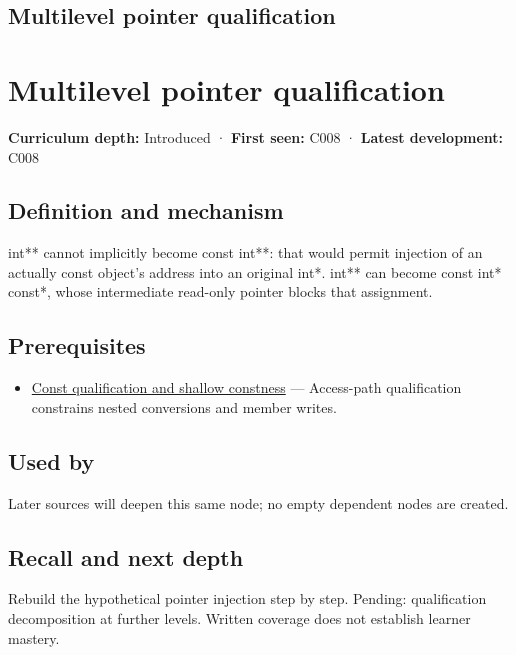 \hypertarget{appendix-5e1a7561cd98}{}
\section*{Multilevel pointer qualification}
\chapter{Multilevel pointer qualification}\label{appendix-5e1a7561cd98-multilevel-pointer-qualification}

\textbf{Curriculum depth:} Introduced · \textbf{First seen:} C008 · \textbf{Latest development:} C008

\section{Definition and mechanism}\label{appendix-5e1a7561cd98-definition-and-mechanism}

int** cannot implicitly become const int**: that would permit injection of an actually const object's address into an original int*. int** can become const int* const*, whose intermediate read-only pointer blocks that assignment.

\section{Prerequisites}\label{appendix-5e1a7561cd98-prerequisites}

\begin{itemize}
\tightlist
\item
  \hyperref[appendix-c25d60fed375]{Const qualification and shallow constness} --- Access-path qualification constrains nested conversions and member writes.
\end{itemize}

\section{Used by}\label{appendix-5e1a7561cd98-used-by}

Later sources will deepen this same node; no empty dependent nodes are created.

\section{Recall and next depth}\label{appendix-5e1a7561cd98-recall-and-next-depth}

Rebuild the hypothetical pointer injection step by step. Pending: qualification decomposition at further levels. Written coverage does not establish learner mastery.

